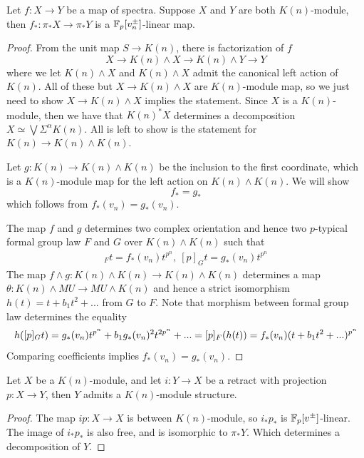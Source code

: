 \begin{lemma}
    Let $f:X\to Y$ be a map of spectra. Suppose $X$ and $Y$ are both $K(n)$-module, then $f_*:\pi_* X\to \pi_*Y$ is a $\mathbb{F}_p[v_n^{\pm}]$-linear map.
\end{lemma}
\begin{proof}
    From the unit map $S\to K(n)$, there is factorization of $f$
    \[
        X\to K(n)\wedge X\to K(n)\wedge Y\to Y
    \]where we let $K(n)\wedge X$ and $K(n)\wedge X$ admit the canonical left action of $K(n)$. All of these but $X\to K(n)\wedge X$ are $K(n)$-module 
    map, so we just need to show $X\to K(n)\wedge X$ implies the statement. Since $X$ is a $K(n)$-module, then we have that $K(n)^*X$ determines a 
    decomposition $X\simeq \bigvee \Sigma^{\alpha}K(n)$. All is left to show is the statement for $K(n)\to K(n)\wedge K(n)$.

    Let $g: K(n)\to K(n)\wedge K(n)$ be the inclusion to the first coordinate, which is a $K(n)$-module map for the left action on $K(n)\wedge K(n)$. We will show
    \[
    f_*=g_*
    \]which follows from $f_*(v_n)=g_*(v_n)$.

    The map $f$ and $g$ determines two complex orientation and hence two $p$-typical formal group law $F$ and $G$ over $K(n)\wedge K(n)$ such that
    \begin{align*}
    [p]_Ft=f_*(v_n)t^{p^n}, \ [p]_G t=g_*(v_n)t^{p^n}
    \end{align*}
    The map $f\wedge g:K(n)\wedge K(n)\to K(n)\wedge K(n)$ determines a map $\theta:K(n)\wedge MU\to MU\wedge K(n)$ and hence a 
    strict isomorphism $h(t)=t+b_1t^2+...$ from $G$ to $F$. Note that morphism between formal group law determines the equality
    \[
    h([p]_Gt)=g_*(v_n)t^{p^n}+b_1g_*(v_n)^2t^{2p^n}+...
    \\= [p]_F (h(t))=f_*(v_n)(t+b_1t^2+...)^{p^n}
    \]
    Comparing coefficients implies $f_*(v_n)=g_*(v_n)$.
\end{proof}

\begin{corollary}
    Let $X$ be a $K(n)$-module, and let $i:Y\to X$ be a retract with projection $p: X\to Y$, then $Y$ admits a $K(n)$-module structure.
\end{corollary}
\begin{proof}  

    The map $ip: X\to X$ is between $K(n)$-module, so $i_*p_*$ is $\mathbb{F}_p[v^{\pm}]$-linear. The image of $i_*p_*$ is also free, and is isomorphic to $\pi_*Y$. Which determines a decomposition of $Y$.
\end{proof}

